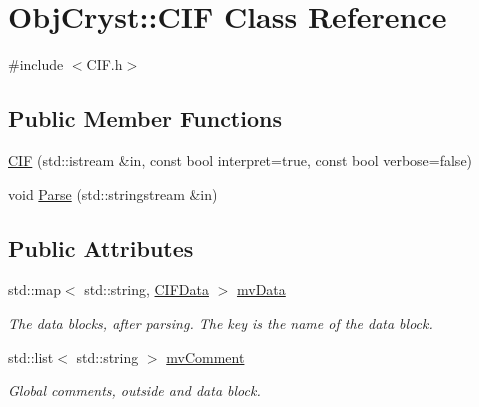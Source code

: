 \hypertarget{class_obj_cryst_1_1_c_i_f}{}\section{Obj\+Cryst\+::C\+IF Class Reference}
\label{class_obj_cryst_1_1_c_i_f}


{\ttfamily \#include $<$C\+I\+F.\+h$>$}

\subsection*{Public Member Functions}
\begin{DoxyCompactItemize}
\item 
\mbox{\hyperlink{class_obj_cryst_1_1_c_i_f_ad570039a62026b01b0fdbcd9f9480d7a}{C\+IF}} (std\+::istream \&in, const bool interpret=true, const bool verbose=false)
\item 
void \mbox{\hyperlink{class_obj_cryst_1_1_c_i_f_ad3d151ac993f8afcf4e5f22773df2e0c}{Parse}} (std\+::stringstream \&in)
\end{DoxyCompactItemize}
\subsection*{Public Attributes}
\begin{DoxyCompactItemize}
\item 
\mbox{\label{class_obj_cryst_1_1_c_i_f_adc6341fa5bbfaf7257752959317a2b57}} 
std\+::map$<$ std\+::string, \mbox{\hyperlink{class_obj_cryst_1_1_c_i_f_data}{C\+I\+F\+Data}} $>$ \mbox{\hyperlink{class_obj_cryst_1_1_c_i_f_adc6341fa5bbfaf7257752959317a2b57}{mv\+Data}}
\begin{DoxyCompactList}\small\item\em The data blocks, after parsing. The key is the name of the data block. \end{DoxyCompactList}\item 
\mbox{\label{class_obj_cryst_1_1_c_i_f_ac0cd3903198ad04595488047a046e470}} 
std\+::list$<$ std\+::string $>$ \mbox{\hyperlink{class_obj_cryst_1_1_c_i_f_ac0cd3903198ad04595488047a046e470}{mv\+Comment}}
\begin{DoxyCompactList}\small\item\em Global comments, outside and data block. \end{DoxyCompactList}\end{DoxyCompactItemize}


